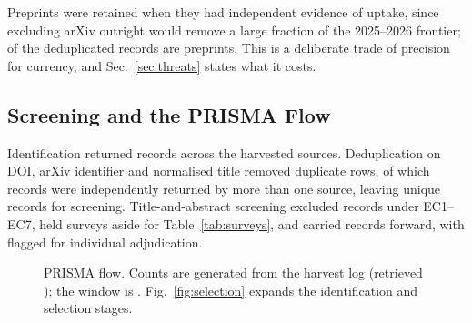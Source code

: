 \documentclass[journal]{IEEEtran}
\begin{document}
Preprints were retained when they had independent evidence of uptake, since
excluding arXiv outright would remove a large fraction of the 2025--2026
frontier; \CorpusPreprint{} of the deduplicated records are preprints. This
is a deliberate trade of precision for currency, and
Sec.~\ref{sec:threats} states what it costs.

\subsection{Screening and the PRISMA Flow}
Identification returned \CorpusRaw{} records across the harvested sources.
Deduplication on DOI, arXiv identifier and normalised title removed
\CorpusDupes{} duplicate rows, of which \CorpusMultiSource{} records were
independently returned by more than one source, leaving \CorpusDedup{}
unique records for screening. Title-and-abstract screening excluded
\ScrExclude{} records under EC1--EC7, held \ScrSurvey{} surveys aside for
Table~\ref{tab:surveys}, and carried \ScrInclude{} records forward, with
\ScrCheck{} flagged for individual adjudication.

\begin{figure}[!t]
  \centering
  \caption{PRISMA flow. Counts are generated from the harvest log
  (retrieved \HarvestDate{}); the window is \HarvestWindow{}.
  Fig.~\ref{fig:selection} expands the identification and selection stages.}
  \label{fig:prisma}
\end{figure}
\end{document}
